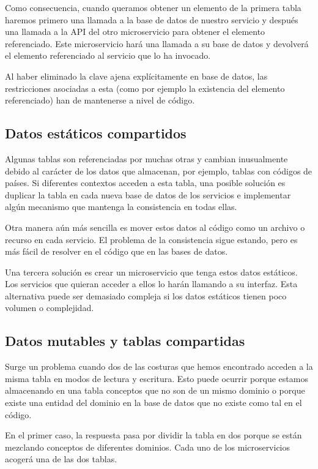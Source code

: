 \documentclass[11pt,a4paper]{article}
\begin{document}
Como consecuencia, cuando queramos obtener un elemento de la primera tabla haremos primero una llamada a la base de datos de nuestro servicio y después una llamada a la API del otro microservicio para obtener el elemento referenciado. Este microservicio hará una llamada a su base de datos y devolverá el elemento referenciado al servicio que lo ha invocado.

Al haber eliminado la clave ajena explícitamente en base de datos, las restricciones asociadas a esta (como por ejemplo la existencia del elemento referenciado) han de mantenerse a nivel de código.

\subsection{Datos estáticos compartidos}

Algunas tablas son referenciadas por muchas otras y cambian inusualmente debido al carácter de los datos que almacenan, por ejemplo, tablas con códigos de países. Si diferentes contextos acceden a esta tabla, una posible solución es duplicar la tabla en cada nueva base de datos de los servicios e implementar algún mecanismo que mantenga la consistencia en todas ellas.

Otra manera aún más sencilla es mover estos datos al código como un archivo o recurso en cada servicio. El problema de la consistencia sigue estando, pero es más fácil de resolver en el código que en las bases de datos.

Una tercera solución es crear un microservicio que tenga estos datos estáticos. Los servicios que quieran acceder a ellos lo harán llamando a su interfaz. Esta alternativa puede ser demasiado compleja si los datos estáticos tienen poco volumen o complejidad.

\subsection{Datos mutables y tablas compartidas}

Surge un problema cuando dos de las costuras que hemos encontrado acceden a la misma tabla en modos de lectura y escritura. Esto puede ocurrir porque estamos almacenando en una tabla conceptos que no son de un mismo dominio o porque existe una entidad del dominio en la base de datos que no existe como tal en el código.

En el primer caso, la respuesta pasa por dividir la tabla en dos porque se están mezclando conceptos de diferentes dominios. Cada uno de los microservicios acogerá una de las dos tablas.
\end{document}

